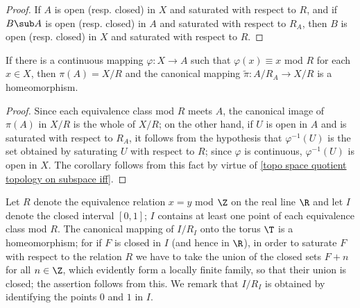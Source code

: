\begin{proof}
If $A$ is open (resp. closed) in $X$ and saturated with respect to $R$, and if $B\sub A$ is open (resp. closed) in $A$ and saturated with respect to $R_A$, then $B$ is open (resp. closed) in $X$ and saturated with respect to $R$.
\end{proof}
\begin{corollary}\label{topo space quotient map on sectioned orbit subspace}
If there is a continuous mapping $\varphi:X\to A$ such that $\varphi(x)\equiv x$ mod $R$ for each $x\in X$, then $\pi(A)=X/R$ and the canonical mapping $\tilde{\pi}:A/R_A\to X/R$ is a homeomorphism.
\end{corollary}
\begin{proof}
Since each equivalence class mod $R$ meets $A$, the canonical image of $\pi(A)$ in $X/R$ is the whole of $X/R$; on the other hand, if $U$ is open in $A$ and is saturated with respect to $R_A$, it follows from the hypothesis that $\varphi^{-1}(U)$ is the set obtained by saturating $U$ with respect to $R$; since $\varphi$ is continuous, $\varphi^{-1}(U)$ is open in $X$. The corollary follows from this fact by virtue of \cref{topo space quotient topology on subspace iff}.
\end{proof}
\begin{example}
Let $R$ denote the equivalence relation $x=y$ mod $\Z$ on the real line $\R$ and let $I$ denote the closed interval $[0,1]$; $I$ contains at least one point of each equivalence class mod $R$. The canonical mapping of $I/R_I$ onto the torus $\T$ is a homeomorphism; for if $F$ is closed in $I$ (and hence in $\R$), in order to saturate $F$ with respect to the relation $R$ we have to take the union of the closed sets $F+n$ for all $n\in\Z$, which evidently form a locally finite family, so that their union is closed; the assertion follows from this. We remark that $I/R_I$ is obtained by identifying the points $0$ and $1$ in $I$.
\end{example}
